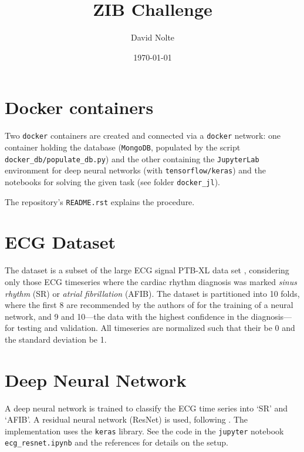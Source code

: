 \documentclass[11pt]{article}
\title{ZIB Challenge}
\author{David Nolte}
\date{\today}
\begin{document}
\maketitle

\section*{Docker containers}

Two \verb!docker! containers are created and connected via a \verb!docker!
network: one container holding the database (\verb!MongoDB!, populated by the
script \verb!docker_db/populate_db.py!) and the other containing the
\verb!JupyterLab!  environment for deep neural networks (with
\verb!tensorflow/keras!) and the notebooks for solving the given task (see
folder \verb!docker_jl!).

The repository's \verb!README.rst! explains the procedure.

\section*{ECG Dataset}
The dataset is a subset of the large ECG signal PTB-XL data
set \cite{wagner_ptb-xl_2020}, considering only
those ECG timeseries where the cardiac rhythm diagnosis was marked \emph{sinus
    rhythm} (SR) or \emph{atrial fibrillation} (AFIB).
The dataset is partitioned into 10 folds, where the first 8 are recommended
by the authors of \cite{wagner_ptb-xl_2020} for the training of a neural network, and 9 and 10---the
data with the highest confidence in the diagnosis---for testing and validation.
All timeseries are normalized such that their be 0 and the standard deviation be 1.

\section*{Deep Neural Network}
A deep neural network is trained to classify the ECG time series into `SR' and
`AFIB'. A residual neural network (ResNet) is used, following
\cite{kachuee_ecg_2018,spdrnl_ecg_2021}.
The implementation uses the \verb!keras! library.
See the code in the \verb!jupyter! notebook \verb!ecg_resnet.ipynb! and the
references \cite{kachuee_ecg_2018,spdrnl_ecg_2021} for details on the setup.
\end{document}
